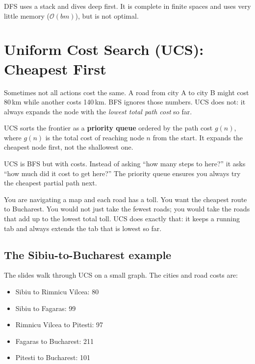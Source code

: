 \documentclass[a4paper,11pt]{article}
\newcommand{\vocab}[1]{\textbf{\color{navy}#1}}
\begin{document}
\begin{keytake}
DFS uses a stack and dives deep first. It is complete in finite spaces and
uses very little memory ($\mathcal{O}(bm)$), but is not optimal.
\end{keytake}

\section{Uniform Cost Search (UCS): Cheapest First}

Sometimes not all actions cost the same. A road from city A to city B might
cost 80\,km while another costs 140\,km. BFS ignores those numbers. UCS does
not: it always expands the node with the \emph{lowest total path cost} so far.

UCS sorts the frontier as a \vocab{priority queue} ordered by the path cost
$g(n)$, where $g(n)$ is the total cost of reaching node $n$ from the start.
It expands the cheapest node first, not the shallowest one.

\begin{intuition}
UCS is BFS but with costs. Instead of asking ``how many steps to here?'' it
asks ``how much did it cost to get here?'' The priority queue ensures you
always try the cheapest partial path next.
\end{intuition}

\begin{everyday}
You are navigating a map and each road has a toll. You want the cheapest route
to Bucharest. You would not just take the fewest roads; you would take the
roads that add up to the lowest total toll. UCS does exactly that: it keeps a
running tab and always extends the tab that is lowest so far.
\end{everyday}

\subsection*{The Sibiu-to-Bucharest example}

The slides walk through UCS on a small graph. The cities and road costs are:
\begin{itemize}
  \item Sibiu to Rimnicu Vilcea: 80
  \item Sibiu to Fagaras: 99
  \item Rimnicu Vilcea to Pitesti: 97
  \item Fagaras to Bucharest: 211
  \item Pitesti to Bucharest: 101
\end{itemize}
\end{document}
